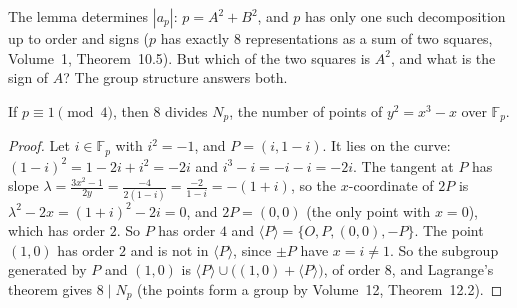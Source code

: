 The lemma determines $|a_p|$: $p=A^2+B^2$, and $p$ has only one such decomposition up to order and signs ($p$ has exactly $8$ representations as a sum of two
squares, Volume~1, Theorem~10.5). But which of the two squares is $A^2$, and what is the sign of $A$? The group structure answers both.

\begin{lemma}\label{conjectures:lem:eightdiv}
If $p\equiv1\pmod4$, then $8$ divides $N_p$, the number of points of $y^2=x^3-x$ over $\mathbb F_p$.
\end{lemma}
\begin{proof}
Let $i\in\mathbb F_p$ with $i^2=-1$, and $P=(i,1-i)$. It lies on the curve: $(1-i)^2=1-2i+i^2=-2i$ and $i^3-i=-i-i=-2i$. The tangent at $P$ has slope
$\lambda=\frac{3x^2-1}{2y}=\frac{-4}{2(1-i)}=\frac{-2}{1-i}=-(1+i)$, so the $x$-coordinate of $2P$ is $\lambda^2-2x=(1+i)^2-2i=0$, and $2P=(0,0)$
(the only point with $x=0$), which has order $2$. So $P$ has order $4$ and $\langle P\rangle=\{O,P,(0,0),-P\}$. The point $(1,0)$ has order $2$ and is not
in $\langle P\rangle$, since $\pm P$ have $x=i\ne1$. So the subgroup generated by $P$ and $(1,0)$ is $\langle P\rangle\cup\bigl((1,0)+\langle P\rangle\bigr)$,
of order $8$, and Lagrange's theorem gives $8\mid N_p$ (the points form a group by Volume~12, Theorem~12.2).
\end{proof}

